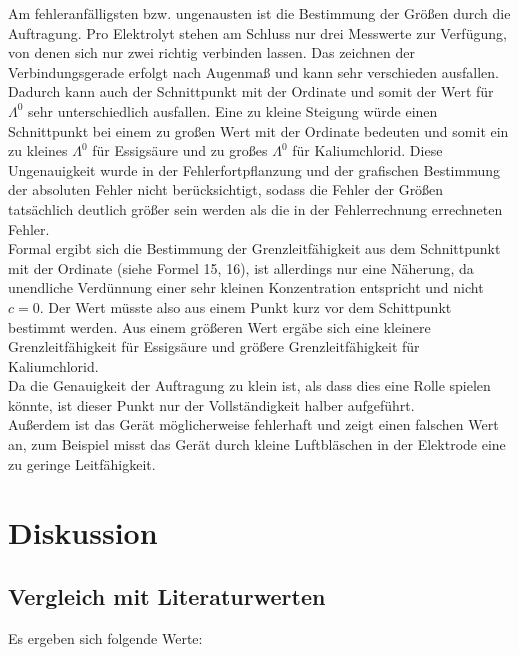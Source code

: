 \documentclass[12pt,a4paper,titlepage,headinclude,bibtotoc]{scrartcl}
\begin{document}
Am fehleranfälligsten bzw. ungenausten ist die Bestimmung der Größen durch die Auftragung. Pro Elektrolyt stehen am Schluss nur drei Messwerte zur Verfügung, von denen sich nur zwei richtig verbinden lassen. Das zeichnen der Verbindungsgerade erfolgt nach Augenmaß und kann sehr verschieden ausfallen. Dadurch kann auch der Schnittpunkt mit der Ordinate und somit der Wert für $\mathit{\Lambda^0}$ sehr unterschiedlich ausfallen. Eine zu kleine Steigung würde einen Schnittpunkt bei einem zu großen Wert mit der Ordinate bedeuten und somit ein zu kleines $\mathit{\Lambda^0}$ für Essigsäure und zu großes $\mathit{\Lambda^0}$ für Kaliumchlorid. Diese Ungenauigkeit wurde in der Fehlerfortpflanzung und der grafischen Bestimmung der absoluten Fehler nicht berücksichtigt, sodass die Fehler der Größen tatsächlich deutlich größer sein werden als die in der Fehlerrechnung errechneten Fehler.\\
Formal ergibt sich die Bestimmung der Grenzleitfähigkeit aus dem Schnittpunkt mit der Ordinate (siehe Formel 15, 16), ist allerdings nur eine Näherung, da unendliche Verdünnung einer sehr kleinen Konzentration entspricht und nicht $c=0$. Der Wert müsste also aus einem Punkt kurz vor dem Schittpunkt bestimmt werden. Aus einem größeren Wert ergäbe sich eine kleinere Grenzleitfähigkeit für Essigsäure und größere Grenzleitfähigkeit für Kaliumchlorid.\\
Da die Genauigkeit der Auftragung zu klein ist, als dass dies eine Rolle spielen könnte, ist dieser Punkt nur der Vollständigkeit halber aufgeführt.\\


Außerdem ist das Gerät möglicherweise fehlerhaft und zeigt einen falschen Wert an, zum Beispiel misst das Gerät durch kleine Luftbläschen in der Elektrode eine zu geringe Leitfähigkeit.\\




\newpage 

\section{Diskussion}
\subsection{Vergleich mit Literaturwerten}

Es ergeben sich folgende Werte:\\
\end{document}
